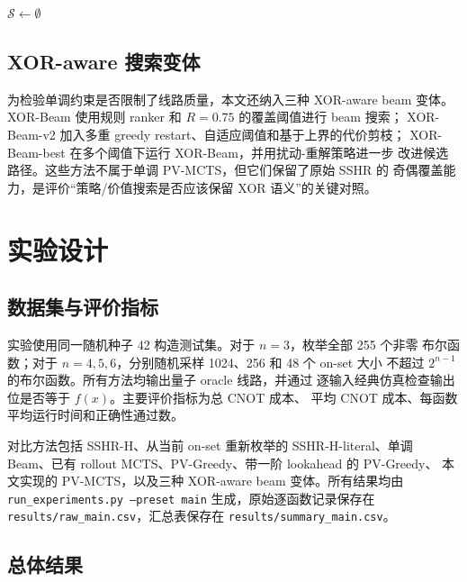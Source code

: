 \documentclass[11pt,letterpaper]{ctexart}
\begin{document}
\begin{algorithm}[t]
\caption{块级 PV-MCTS}
\label{alg:pvmcts}
$\mathcal{S}\leftarrow \emptyset$\;
\end{algorithm}

\subsection{XOR-aware 搜索变体}

为检验单调约束是否限制了线路质量，本文还纳入三种 XOR-aware beam
变体。XOR-Beam 使用规则 ranker 和 $R=0.75$ 的覆盖阈值进行 beam 搜索；
XOR-Beam-v2 加入多重 greedy restart、自适应阈值和基于上界的代价剪枝；
XOR-Beam-best 在多个阈值下运行 XOR-Beam，并用扰动-重解策略进一步
改进候选路径。这些方法不属于单调 PV-MCTS，但它们保留了原始 SSHR 的
奇偶覆盖能力，是评价“策略/价值搜索是否应该保留 XOR 语义”的关键对照。

\section{实验设计}

\subsection{数据集与评价指标}

实验使用同一随机种子 42 构造测试集。对于 $n=3$，枚举全部 255 个非零
布尔函数；对于 $n=4,5,6$，分别随机采样 1024、256 和 48 个 on-set 大小
不超过 $2^{n-1}$ 的布尔函数。所有方法均输出量子 oracle 线路，并通过
逐输入经典仿真检查输出位是否等于 $f(x)$。主要评价指标为总 CNOT 成本、
平均 CNOT 成本、每函数平均运行时间和正确性通过数。

对比方法包括 SSHR-H、从当前 on-set 重新枚举的 SSHR-H-literal、单调
Beam、已有 rollout MCTS、PV-Greedy、带一阶 lookahead 的 PV-Greedy、
本文实现的 PV-MCTS，以及三种 XOR-aware beam 变体。所有结果均由
\texttt{run\_experiments.py --preset main} 生成，原始逐函数记录保存在
\texttt{results/raw\_main.csv}，汇总表保存在
\texttt{results/summary\_main.csv}。

\subsection{总体结果}
\end{document}
